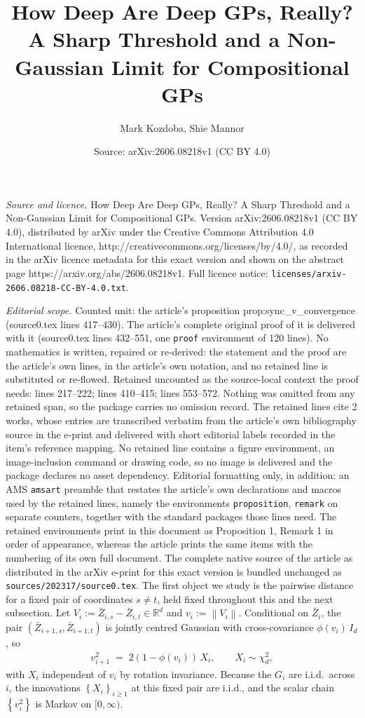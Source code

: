 \documentclass[10pt,a4paper]{amsart}
\title{How Deep Are Deep GPs, Really? A Sharp Threshold and a Non-Gaussian Limit for Compositional GPs}
\author{Mark Kozdoba, Shie Mannor}
\date{Source: arXiv:2606.08218v1 (CC BY 4.0)}
\newcommand{\Brack}[1]{\left( #1 \right)}
\newcommand{\RR}{\mathbb{R}}
\newcommand{\Set}[1]{\left\{ #1 \right\}}
\newcommand{\bZ}{\bar{Z}}
\newcommand{\norm}[1]{\left\|#1\right\|}
\begin{document}
\maketitle

\noindent\emph{Source and licence.} How Deep Are Deep GPs, Really? A Sharp Threshold and a Non-Gaussian Limit for Compositional GPs. Version arXiv:2606.08218v1 (CC BY 4.0), distributed by arXiv under the Creative Commons Attribution 4.0 International licence, http://creativecommons.org/licenses/by/4.0/, as recorded in the arXiv licence metadata for this exact version and shown on the abstract page https://arxiv.org/abs/2606.08218v1. Full licence notice: \texttt{licenses/arxiv-2606.08218-CC-BY-4.0.txt}.\par\smallskip

\noindent\textit{Editorial scope.} Counted unit: the article's proposition prop:sync\_v\_convergence (source0.tex lines 417--430). The article's complete original proof of it is delivered with it (source0.tex lines 432--551, one \texttt{proof} environment of 120 lines). No mathematics is written, repaired or re-derived: the statement and the proof are the article's own lines, in the article's own notation, and no retained line is substituted or re-flowed.  Retained uncounted as the source-local context the proof needs: lines 217--222; lines 410--415; lines 553--572.  Nothing was omitted from any retained span, so the package carries no omission record.  The retained lines cite 2 works, whose entries are transcribed verbatim from the article's own bibliography source in the e-print and delivered with short editorial labels recorded in the item's reference mapping.  No retained line contains a figure environment, an image-inclusion command or drawing code, so no image is delivered and the package declares no asset dependency.  Editorial formatting only, in addition: an AMS \texttt{amsart} preamble that restates the article's own declarations and macros used by the retained lines, namely the environments \texttt{proposition}, \texttt{remark} on separate counters, together with the standard packages those lines need.  The retained environments print in this document as Proposition 1, Remark 1 in order of appearance, whereas the article prints the same items with the numbering of its own full document.  The complete native source of the article as distributed in the arXiv e-print for this exact version is bundled unchanged as \texttt{sources/202317/source0.tex}.
The first object we study is the pairwise distance for a fixed pair of coordinates $s \ne t$, held fixed throughout this and the next subsection. Let $V_i := \bZ_{i,s} - \bZ_{i,t} \in \RR^d$ and $v_i := \norm{V_i}$. Conditional on $\bZ_i$, the pair $(\bZ_{i+1,s}, \bZ_{i+1,t})$ is jointly centred Gaussian with cross-covariance $\phi(v_i)\, I_d$, so
\begin{eqnarray}
  \label{eq:kernel_corr_converegnce_d}
  v_{i+1}^2 \;=\; 2\Brack{1 - \phi(v_i)}\, X_i, \qquad X_i \sim \chi^2_d,
\end{eqnarray}
with $X_i$ independent of $v_i$ by rotation invariance. Because the $G_i$ are i.i.d.\ across $i$, the innovations $\Set{X_i}_{i \ge 1}$ at this fixed pair are i.i.d., and the scalar chain $\Set{v_i^2}$ is Markov on $[0, \infty)$.
\end{document}
